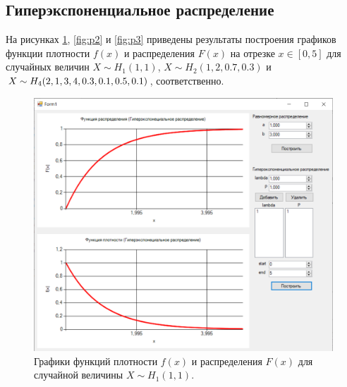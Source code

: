 \documentclass[14pt, a4paper]{extarticle}
\begin{document}
\subsection{Гиперэкспоненциальное распределение}

На рисунках \ref{fig:p1}, \ref{fig:p2} и \ref{fig:p3} приведены результаты построения графиков функции плотности $f(x)$ и распределения $F(x)$ на отрезке $x \in [0, 5]$ для случайных величин $X \sim H_1(1, 1)$, $X \sim H_2(1, 2, 0.7, 0.3)$ и $X \sim H_4(2, 1, 3, 4,\\ 0.3, 0.1, 0.5, 0.1)$, соответственно.

\clearpage
\begin{figure}[h!]
	\begin{center}
		\includegraphics[scale=0.7]{pictures/p1.png}
	\end{center}
	\captionsetup{justification=centering}
	\caption{Графики функций плотности $f(x)$ и распределения $F(x)$ для случайной величины $X \sim H_1(1, 1)$.}
	\label{fig:p1}
\end{figure}
\end{document}
